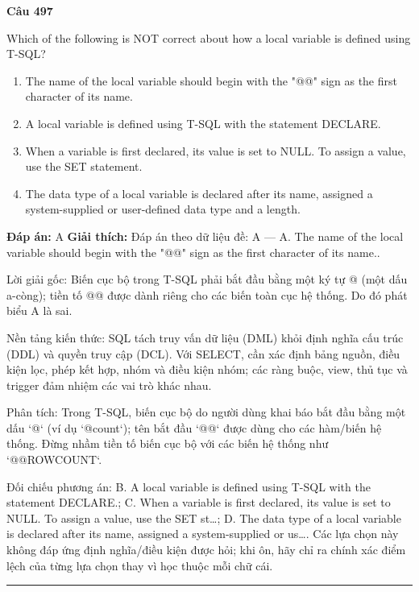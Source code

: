 \documentclass[11pt,a4paper]{article}
\newenvironment{question}[1]{%
  \par\vspace{1em}\noindent\textbf{\large Câu #1}\par\vspace{0.4em}
}{%
  \par\vspace{1em}\hrule\vspace{0.6em}
}
\newenvironment{choices}{%
  \begin{enumerate}[label=\textbf{\Alph*.},leftmargin=2.2em,itemsep=2pt,topsep=3pt]
}{%
  \end{enumerate}
}
\newcommand{\choice}{\item}
\begin{document}
\begin{question}{497}
Which of the following is NOT correct about how a local variable is defined using T-SQL?
\begin{choices}
\choice The name of the local variable should begin with the "@@" sign as the first character of its name.
\choice A local variable is defined using T-SQL with the statement DECLARE.
\choice When a variable is first declared, its value is set to NULL. To assign a value, use the SET statement.
\choice The data type of a local variable is declared after its name, assigned a system-supplied or user-defined data type and a length.
\end{choices}
\textbf{Đáp án:} A
\textbf{Giải thích:} Đáp án theo dữ liệu đề: A — A. The name of the local variable should begin with the "@@" sign as the first character of its name..

Lời giải gốc: Biến cục bộ trong T-SQL phải bắt đầu bằng một ký tự @ (một dấu a-còng); tiền tố @@ được dành riêng cho các biến toàn cục hệ thống. Do đó phát biểu A là sai.

Nền tảng kiến thức: SQL tách truy vấn dữ liệu (DML) khỏi định nghĩa cấu trúc (DDL) và quyền truy cập (DCL). Với SELECT, cần xác định bảng nguồn, điều kiện lọc, phép kết hợp, nhóm và điều kiện nhóm; các ràng buộc, view, thủ tục và trigger đảm nhiệm các vai trò khác nhau.

Phân tích: Trong T-SQL, biến cục bộ do người dùng khai báo bắt đầu bằng một dấu `@` (ví dụ `@count`); tên bắt đầu `@@` được dùng cho các hàm/biến hệ thống. Đừng nhầm tiền tố biến cục bộ với các biến hệ thống như `@@ROWCOUNT`.

Đối chiếu phương án: B. A local variable is defined using T-SQL with the statement DECLARE.; C. When a variable is first declared, its value is set to NULL. To assign a value, use the SET st…; D. The data type of a local variable is declared after its name, assigned a system-supplied or us…. Các lựa chọn này không đáp ứng định nghĩa/điều kiện được hỏi; khi ôn, hãy chỉ ra chính xác điểm lệch của từng lựa chọn thay vì học thuộc mỗi chữ cái.
\end{question}
\end{document}
